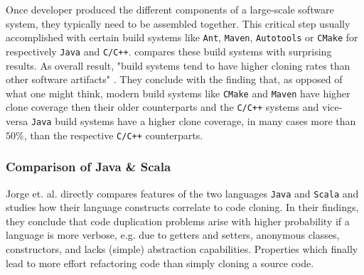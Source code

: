 Once developer produced the different components of a large-scale software system, they typically need to be assembled together. This critical step usually accomplished with certain build systems like \texttt{Ant}, \texttt{Maven}, \texttt{Autotools} or \texttt{CMake} for respectively \texttt{Java} and \texttt{C/C++}. \cite{mcintosh2014collecting} compares these build systems with surprising results. As overall result, "build systems tend to have higher cloning rates than other software artifacts" \cite{mcintosh2014collecting}. 
They conclude with the finding that, as opposed of what one might think, modern build systems like \texttt{CMake} and \texttt{Maven} have higher clone coverage then their older counterparts and the \texttt{C/C++} systems and vice-versa \texttt{Java} build systems have a higher clone coverage, in many cases more than $50\%$, than the respective \texttt{C/C++} counterparts.

\subsubsection{Comparison of Java \& Scala}

Jorge et. al. \cite{jorge2012impact} directly compares features of the two languages \texttt{Java} and \texttt{Scala} and studies how their language constructs correlate to code cloning. In their findings, they conclude that code duplication problems arise with higher probability if a language is more verbose, e.g. due to getters and setters, anonymous classes, constructors, and lacks (simple) abstraction capabilities. Properties which finally lead to more effort refactoring code than simply cloning a source code. \cite{jorge2012impact}
